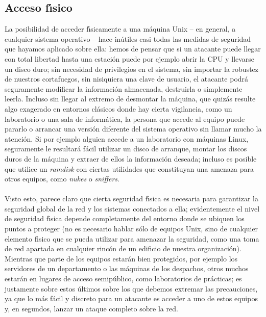 \subsection{Acceso f\'{\i}sico}
La posibilidad de acceder f\'{\i}sicamente a una m\'aquina Unix -- en general,
a cualquier sistema operativo -- hace in\'utiles casi todas las medidas de 
seguridad que hayamos aplicado sobre ella: hemos de pensar que si un atacante 
puede llegar con total libertad hasta una estaci\'on puede por ejemplo abrir la 
CPU y llevarse un disco duro; sin necesidad de privilegios en el sistema, sin
importar la robustez de nuestros cortafuegos, sin nisiquiera una clave de 
usuario, el atacante podr\'a seguramente modificar la informaci\'on almacenada, 
destruirla o simplemente leerla. Incluso sin llegar al extremo de desmontar
la m\'aquina, que quiz\'as resulte algo exagerado en entornos cl\'asicos
donde hay cierta vigilancia, como un laboratorio o una sala de inform\'atica,
la persona que accede al equipo puede pararlo o arrancar una versi\'on 
diferente del sistema operativo sin llamar mucho la atenci\'on. Si por ejemplo
alguien accede a un laboratorio con m\'aquinas Linux, seguramente le resultar\'a
f\'acil utilizar un disco de arranque, montar los discos duros de la m\'aquina
y extraer de ellos la informaci\'on deseada; incluso es posible que utilice un
{\it ramdisk} con ciertas utilidades que constituyan una amenaza para otros 
equipos, como {\it nukes} o {\it sniffers}.\\
\\Visto esto, parece claro que cierta seguridad f\'{\i}sica es necesaria para
garantizar la seguridad global de la red y los sistemas conectados a ella; 
evidentemente el nivel de seguridad f\'{\i}sica depende completamente del 
entorno donde se ubiquen los puntos a proteger (no es necesario hablar s\'olo
de equipos Unix, sino de cualquier elemento f\'{\i}sico que se pueda utilizar
para amenazar la seguridad, como una toma de red apartada en cualquier rinc\'on
de un edificio de nuestra organizaci\'on). Mientras que parte de los equipos 
estar\'an bien protegidos,
por ejemplo los servidores de un departamento o las m\'aquinas de los despachos,
otros muchos estar\'an en lugares de acceso semip\'ublico, como laboratorios
de pr\'acticas; es justamente sobre estos \'ultimos sobre los que debemos 
extremar las precauciones, ya que lo m\'as f\'acil y discreto para un atacante
es acceder a uno de estos equipos y, en segundos, lanzar un ataque completo 
sobre la red.

